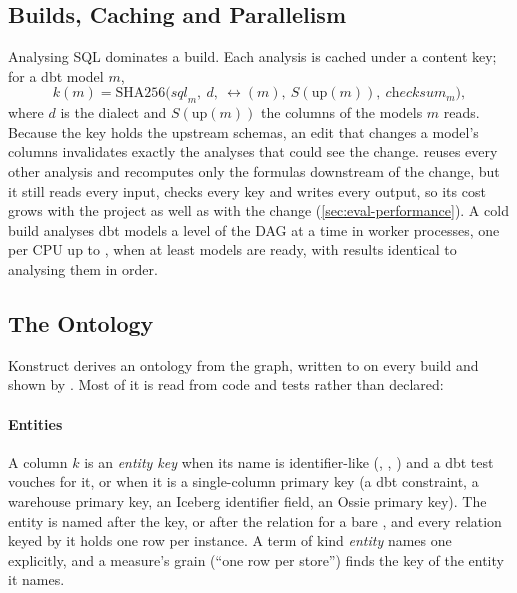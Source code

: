 \subsection{Builds, Caching and Parallelism}
\label{sec:build}

Analysing SQL dominates a build. Each analysis is cached under a content key; for a dbt model $m$,
\begin{equation}
  k(m) = \mathrm{SHA256}\big(\textit{sql}_m,\ d,\ \rel(m),\ S(\mathrm{up}(m)),\ \textit{checksum}_m\big),
  \label{eq:cache}
\end{equation}
where $d$ is the dialect and $S(\mathrm{up}(m))$ the columns of the models $m$ reads. Because the
key holds the upstream schemas, an edit that changes a model's columns invalidates exactly the
analyses that could see the change.  reuses every other analysis
and recomputes only the formulas downstream of the change, but it still reads every input, checks
every key and writes every output, so its cost grows with the project as well as with the change
(\cref{sec:eval-performance}). A cold build analyses dbt models a level of the DAG at a time in
worker processes, one per CPU up to \maxWorkers{}, when at least \parallelMinimum{} models are
ready, with results identical to analysing them in order.

\subsection{The Ontology}
\label{sec:ontology}

Konstruct derives an ontology from the graph, written to  on every build and
shown by . Most of it is read from code and tests rather than declared:

\paragraph{Entities} A column $k$ is an \emph{entity key} when its name is identifier-like
(, , ) and a dbt  test vouches for it, or
when it is a single-column primary key (a dbt constraint, a warehouse primary key, an Iceberg
identifier field, an Ossie primary key). The entity is named after the key, or after the relation
for a bare , and every relation keyed by it holds one row per instance. A term of kind
\emph{entity} names one explicitly, and a measure's grain (``one row per store'') finds the key of
the entity it names.

